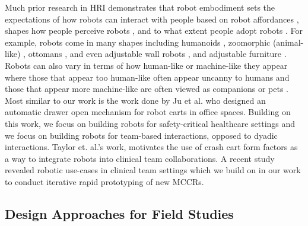 Much prior research in HRI demonstrates that robot embodiment sets the expectations of how robots can interact with people based on robot affordances \cite{norman1999affordance,gibson20133}, shapes how people perceive robots \cite{passman1975mothers,rani2004anxiety, bauer2008human}, and to what extent people adopt robots \cite{riek2017healthcare}.
For example, robots come in many shapes including humanoids \cite{bauer2008human,hayashi2007humanoid,kose2009effects,krogsager2014backchannel}, zoomorphic (animal-like) \cite{short2017understanding,kalegina2018characterizing}, ottomans \cite{sirkin2015mechanical}, and even adjustable wall robots \cite{nguyen2021exploring,wang2019design}, and adjustable furniture \cite{hauser2020roombots,nigolian2017self}.
Robots can also vary in terms of how human-like or machine-like they appear where those that appear too human-like often appear uncanny to humans \cite{strait2015too,koschate2016overcoming} and those that appear more machine-like are often viewed as companions or pets \cite{loffler2020uncanny}. 
Most similar to our work is the work done by Ju et al. \cite{mok2015place} who designed an automatic drawer open mechanism for robot carts in office spaces.
Building on this work, we focus on building robots for safety-critical healthcare settings and we focus on building robots for team-based interactions, opposed to dyadic interactions. Taylor et. al.'s work, \cite{taylor2019coordinating,taylor2024towards} motivates the use of crash cart form factors as a way to integrate robots into clinical team collaborations. A recent study revealed robotic use-cases in clinical team settings which we build on in our work to conduct iterative rapid prototyping of new MCCRs.

\subsection{Design Approaches for Field Studies}

